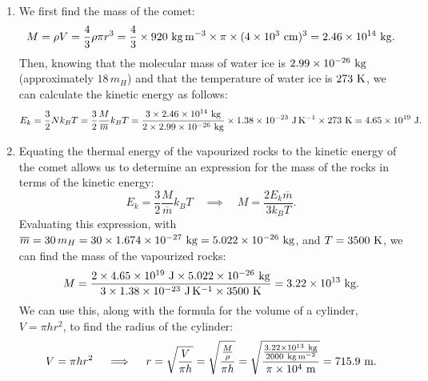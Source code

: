 \documentclass[11pt,letterpaper]{article}
\begin{document}
\begin{enumerate}[label=(\alph*)]
    \item We first find the mass of the comet:
        \begin{align*}
            M = \rho V = \frac{4}{3}\rho \pi r^3 = \frac{4}{3}\times 920~{\rm kg\,m^{-3}}\times \pi \times (4\times 10^{3}~{\rm cm})^3 = 2.46\times 10^{14}~{\rm kg}.
        \end{align*}
        Then, knowing that the molecular mass of water ice is $2.99\times 10^{-26}~{\rm kg}$ (approximately $18\,m_H$) and that the temperature of water ice is $273~{\rm K}$, we can calculate the kinetic energy as follows:
        \begin{align*}
            E_k = \frac{3}{2}Nk_BT = \frac{3}{2}\frac{M}{\overline m}k_BT = \frac{3\times 2.46\times 10^{14}~{\rm kg}}{2\times 2.99\times 10^{-26}~{\rm kg}}\times 1.38\times 10^{-23}~{\rm J\,K^{-1}} \times 273~{\rm K} = 4.65\times 10^{19}~{\rm J}.
        \end{align*}
    \item Equating the thermal energy of the vapourized rocks to the kinetic energy of the comet allows us to determine an expression for the mass of the rocks in terms of the kinetic energy:
        \begin{equation*}
            E_k = \frac{3}{2}\frac{M}{\overline m}k_BT \quad
            \implies \quad M = \frac{2E_k\overline{m}}{3k_BT}.
        \end{equation*}
        Evaluating this expression, with $\overline{m} = 30\,m_H = 30\times 1.674\times 10^{-27}~{\rm kg} = 5.022\times 10^{-26}~{\rm kg}$, and $T = 3500~{\rm K}$, we can find the mass of the vapourized rocks:
        \begin{align*}
            M = \frac{2\times 4.65\times 10^{19}~{\rm J}\times 5.022\times 10^{-26}~{\rm kg}}{3\times 1.38\times 10^{-23}~{\rm J\,K^{-1}}\times 3500~{\rm K}} = 3.22\times 10^{13}~{\rm kg}.
        \end{align*}
        We can use this, along with the formula for the volume of a cylinder, $V = \pi hr^2$, to find the radius of the cylinder:
        \begin{equation*}
            V = \pi hr^2 \\\quad
            \implies \quad r = \sqrt{\frac{V}{\pi h}} = \sqrt{\frac{\frac{M}{\rho}}{\pi h}} = \sqrt{\frac{\frac{3.22\times 10^{13}~{\rm kg}}{2000~{\rm kg\,m^{-3}}}}{\pi \times 10^{4}~{\rm m}}} = 715.9~{\rm m}.
        \end{equation*}


\end{enumerate}
\end{document}
